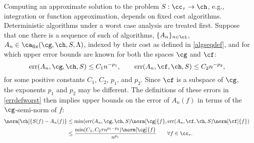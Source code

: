 \documentclass[final]{elsarticle}
\DeclareMathOperator{\err}{err}
\theoremstyle{definition}
\theoremstyle{remark}
\DeclareMathOperator{\fix}{fix}
\begin{document}
Computing an approximate solution to the problem $S: \cc_{\tau} \to \ch$, e.g., integration or function approximation, depends on fixed cost algorithms. Deterministic algorithms under a worst case analysis are treated first.  Suppose that one there is a sequence of such of algorithms, $\{A_n\}_{n \in \ci}$, $A_n  \in \ca_{\fix}(\cg,\ch,S,\Lambda)$, indexed by their cost as defined in \eqref{algseqdef}, and for which upper error bounds are known for both the spaces $\cg$ and $\cf$:
\begin{equation}\label{algseqerrbd}
\err(A_n,\cg,\ch,S) \le C_{1} n^{-p_1}, \qquad \err(A_n,\cf,\ch,S) \le C_{2} n^{-p_2}, 
\end{equation}
for some positive constants $C_1$, $C_2$, $p_1$, and $p_2$.  Since $\cf$ is a subspace of $\cg$, the exponents $p_1$ and $p_2$ may be different.  The definitions of these errors in \eqref{errdefworst} then implies upper bounds on the error of $A_n(f)$ in terms of the $\cg$-semi-norm of $f$:
\begin{align} \nonumber
\norm[\ch]{S(f) -  A_n(f)} &\le \min(\err(A_n,\cg,\ch,S)\norm[\cg]{f},\err(A_n,\cf,\ch,S)\norm[\cf]{f}) \\
\label{Anerrbound}
&\le \frac{\min(C_1,C_2\tau n^{p_1-p_2})\norm[\cg]{f}}{n^{p_1}} \qquad \forall f \in \cc_{\tau}.
\end{align}
\end{document}
